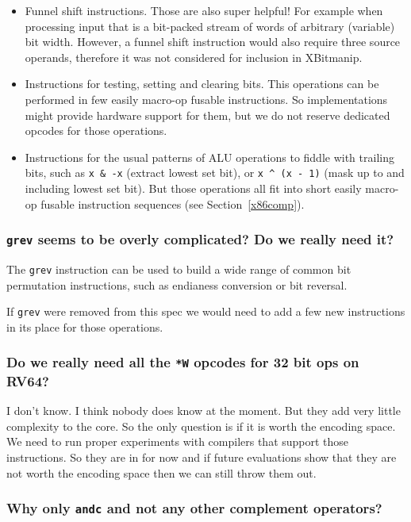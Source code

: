 \begin{itemize}
\item Funnel shift instructions. Those are also super helpful! For example when
processing input that is a bit-packed stream of words of arbitrary (variable)
bit width. However, a funnel shift instruction would also require three source
operands, therefore it was not considered for inclusion in XBitmanip.

\item Instructions for testing, setting and clearing bits. This operations can
be performed in few easily macro-op fusable instructions. So implementations
might provide hardware support for them, but we do not reserve dedicated opcodes
for those operations.

\item Instructions for the usual patterns of ALU operations to fiddle with
trailing bits, such as {\tt x \& -x} (extract lowest set bit), or
{\tt x \^{} (x - 1)} (mask up to and including lowest set bit). But those
operations all fit into short easily macro-op fusable instruction sequences
(see Section~\ref{x86comp}).
\end{itemize}

\subsubsection{\texttt{grev} seems to be overly complicated? Do we really need it?}

The \texttt{grev} instruction can be used to build a wide range of common
bit permutation instructions, such as endianess conversion or bit reversal.

If \texttt{grev} were removed from this spec we would need to add a few
new instructions in its place for those operations.

\subsubsection{Do we really need all the \texttt{*W} opcodes for 32 bit ops on RV64?}

I don't know. I think nobody does know at the moment. But they add very little
complexity to the core. So the only question is if it is worth the encoding
space. We need to run proper experiments with compilers that support those
instructions. So they are in for now and if future evaluations show that they
are not worth the encoding space then we can still throw them out.

\subsubsection{Why only \texttt{andc} and not any other complement operators?}


